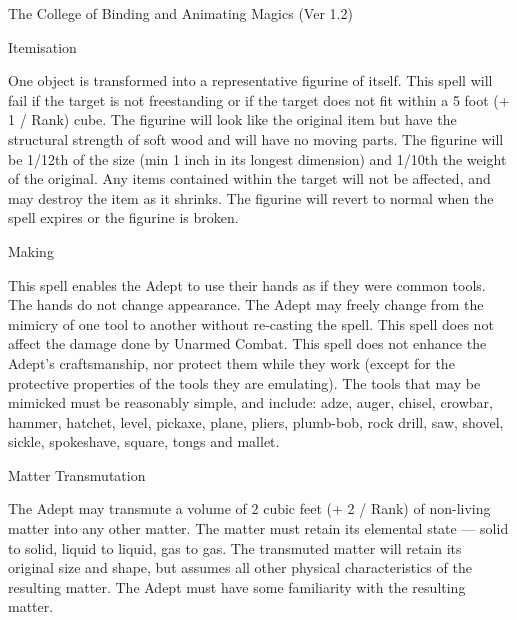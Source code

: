 \begin{Chapter}{The College of Binding and Animating Magics (Ver 1.2)}
\begin{spell}[S-7]{Itemisation }
\begin{effects}
One object is transformed into a representative figurine of itself.
This spell will fail if the target is not freestanding or if the
target does not fit within a 5 foot (+ 1 / Rank) cube. The figurine
will look like the original item but have the structural strength of
soft wood and will have no moving parts. The figurine will be 1/12th
of the size (min 1 inch in its longest dimension) and 1/10th the
weight of the original. Any items contained within the target will not
be affected, and may destroy the item as it shrinks.  The figurine
will revert to normal when the spell expires or the figurine is
broken.
\end{effects}
\end{spell}

\begin{spell}[S-8]{Making}

\begin{effects}
This spell enables the Adept to use their hands as if they were common
tools. The hands do not change appearance.  The Adept may freely
change from the mimicry of one tool to another without re-casting the
spell.  This spell does not affect the damage done by Unarmed
Combat. This spell does not enhance the Adept’s craftsmanship, nor
protect them while they work (except for the protective properties of
the tools they are emulating).  The tools that may be mimicked must be
reasonably simple, and include: adze, auger, chisel, crowbar, hammer,
hatchet, level, pickaxe, plane, pliers, plumb-bob, rock drill, saw,
shovel, sickle, spokeshave, square, tongs and mallet.
\end{effects}
\end{spell}

\begin{spell}[S-9]{Matter Transmutation }

\begin{effects}
The Adept may transmute a volume of 2 cubic feet (+ 2 / Rank) of
non-living matter into any other matter.  The matter must retain its
elemental state — solid to solid, liquid to liquid, gas to gas.  The
transmuted matter will retain its original size and shape, but assumes
all other physical characteristics of the resulting matter.  The Adept
must have some familiarity with the resulting matter.
\end{effects}
\end{spell}


\end{Chapter}
